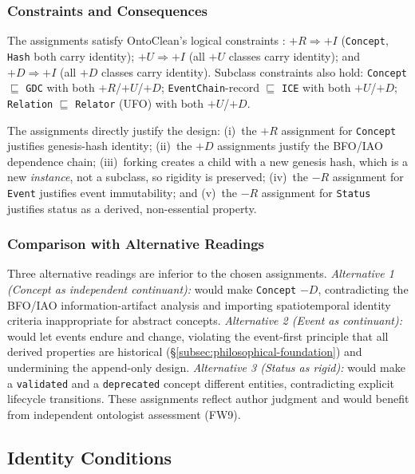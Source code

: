 \subsubsection{Constraints and Consequences}\label{subsubsec:ontoclean-constraints}

The assignments satisfy OntoClean's logical constraints \cite{ontoclean,guarino2002evaluating}: $+R \Rightarrow +I$ (\texttt{Concept}, \texttt{Hash} both carry identity); $+U \Rightarrow +I$ (all $+U$ classes carry identity); and $+D \Rightarrow +I$ (all $+D$ classes carry identity). Subclass constraints also hold: \texttt{Concept} $\sqsubseteq$ \texttt{GDC} with both $+R$/$+U$/$+D$; \texttt{EventChain}-record $\sqsubseteq$ \texttt{ICE} with both $+U$/$+D$; \texttt{Relation} $\sqsubseteq$ \texttt{Relator} (UFO) with both $+U$/$+D$.

The assignments directly justify the design: (i)~the $+R$ assignment for \texttt{Concept} justifies genesis-hash identity; (ii)~the $+D$ assignments justify the BFO/IAO dependence chain; (iii)~forking creates a child with a new genesis hash, which is a new \emph{instance}, not a subclass, so rigidity is preserved; (iv)~the $-R$ assignment for \texttt{Event} justifies event immutability; and (v)~the $-R$ assignment for \texttt{Status} justifies status as a derived, non-essential property.

\subsubsection{Comparison with Alternative Readings}\label{subsubsec:ontoclean-alternatives}

Three alternative readings are inferior to the chosen assignments. \emph{Alternative 1 (Concept as independent continuant):} would make \texttt{Concept} $-D$, contradicting the BFO/IAO information-artifact analysis \cite{smith2012ontology} and importing spatiotemporal identity criteria inappropriate for abstract concepts. \emph{Alternative 2 (Event as continuant):} would let events endure and change, violating the event-first principle that all derived properties are historical (\S\ref{subsec:philosophical-foundation}) and undermining the append-only design. \emph{Alternative 3 (Status as rigid):} would make a \texttt{validated} and a \texttt{deprecated} concept different entities, contradicting explicit lifecycle transitions. These assignments reflect author judgment and would benefit from independent ontologist assessment (FW9).

\subsection{Identity Conditions}\label{subsec:identity-conditions}

